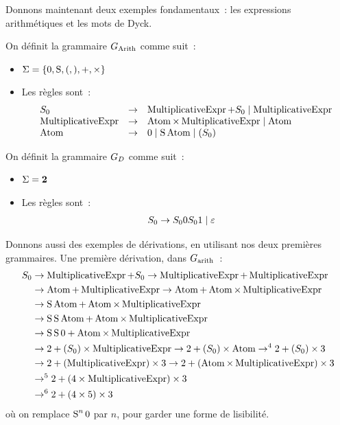 Donnons maintenant deux exemples fondamentaux~: les expressions arithmétiques et
les mots de Dyck.

\begin{example}
  On définit la grammaire $G_{\operatorname{Arith}}$ comme suit~:
  \begin{itemize}
  \item $\Sigma = \{0,\operatorname{S},(,),+,\times\}$
  \item Les règles sont~:
    \[\begin{array}{lcl}
    S_{0} & \to & \operatorname{MultiplicativeExpr} + S_{0} \mid \operatorname{MultiplicativeExpr}\\
    \operatorname{MultiplicativeExpr} & \to & \operatorname{Atom} \times \operatorname{MultiplicativeExpr} \mid \operatorname{Atom}\\
    \operatorname{Atom} & \to & 0 \mid \operatorname{S}\operatorname{Atom} \mid (S_{0})
    \end{array}\]
  \end{itemize}
  
  On définit la grammaire $G_D$ comme suit~:
  \begin{itemize}
  \item $\Sigma = \bm{2}$
  \item Les règles sont~:
    \begin{align*}
      S_{0} &\to S_{0} 0S_{0} 1\mid\varepsilon
    \end{align*}
  \end{itemize}
\end{example}

Donnons aussi des exemples de dérivations, en utilisant nos deux premières
grammaires. Une première dérivation, dans $G_{\mathrm{arith}}$~:
\begin{align*}
  S_{0} &\to \operatorname{MultiplicativeExpr} + S_{0} \to \operatorname{MultiplicativeExpr} + \operatorname{MultiplicativeExpr} \\
  &\to \operatorname{Atom} + \operatorname{MultiplicativeExpr} \to \operatorname{Atom} + \operatorname{Atom} \times \operatorname{MultiplicativeExpr} \\
  &\to \operatorname{S}\operatorname{Atom} + \operatorname{Atom}\times \operatorname{MultiplicativeExpr} \\
  &\to \operatorname{S}\operatorname{S}\operatorname{Atom} + \operatorname{Atom}\times \operatorname{MultiplicativeExpr} \\
  &\to \operatorname{S}\operatorname{S} 0 + \operatorname{Atom}\times\operatorname{MultiplicativeExpr} \\
  &\to 2 + (S_{0})\times \operatorname{MultiplicativeExpr} \to
  2 + (S_{0}) \times \operatorname{Atom} \to^4 2 + (S_{0}) \times 3\\
  &\to 2 + (\operatorname{MultiplicativeExpr}) \times 3 \to 2 + (\operatorname{Atom} \times \operatorname{MultiplicativeExpr}) \times 3\\
  &\to^5 2 + (4 \times \operatorname{MultiplicativeExpr}) \times 3\\
  &\to^6 2 + (4 \times 5) \times 3
\end{align*}
où on remplace $\operatorname{S}^n 0$ par $n$, pour garder une forme de lisibilité.

